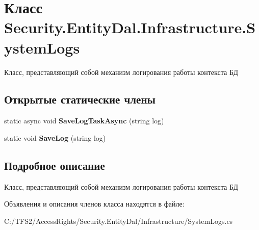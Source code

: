 \hypertarget{class_security_1_1_entity_dal_1_1_infrastructure_1_1_system_logs}{}\section{Класс Security.\+Entity\+Dal.\+Infrastructure.\+System\+Logs}
\label{class_security_1_1_entity_dal_1_1_infrastructure_1_1_system_logs}


Класс, представляющий собой механизм логирования работы контекста БД  


\subsection*{Открытые статические члены}
\begin{DoxyCompactItemize}
\item 
\mbox{\label{class_security_1_1_entity_dal_1_1_infrastructure_1_1_system_logs_acb81e9b749929745327c5485a75982e2}} 
static async void {\bfseries Save\+Log\+Task\+Async} (string log)
\item 
\mbox{\label{class_security_1_1_entity_dal_1_1_infrastructure_1_1_system_logs_aed00ed6c8c1943b582bc08a3a1a39564}} 
static void {\bfseries Save\+Log} (string log)
\end{DoxyCompactItemize}


\subsection{Подробное описание}
Класс, представляющий собой механизм логирования работы контекста БД 



Объявления и описания членов класса находятся в файле\+:\begin{DoxyCompactItemize}
\item 
C\+:/\+T\+F\+S2/\+Access\+Rights/\+Security.\+Entity\+Dal/\+Infrastructure/System\+Logs.\+cs\end{DoxyCompactItemize}
